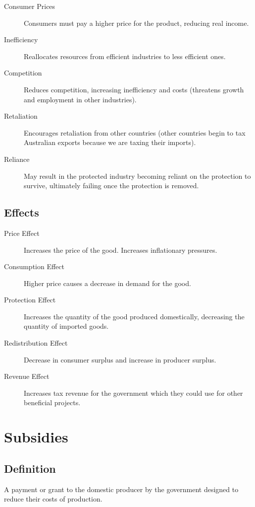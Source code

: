 \documentclass[a4paper,11pt]{report}
\begin{document}
\begin{description}
\item [Consumer Prices] Consumers must pay a higher price for the product,
	reducing real income.
\item [Inefficiency] Reallocates resources from efficient industries to less
	efficient ones.
\item [Competition] Reduces competition, increasing inefficiency and costs
	(threatens growth and employment in other industries).
\item [Retaliation] Encourages retaliation from other countries (other countries
	begin to tax Australian exports because we are taxing their imports).
\item [Reliance] May result in the protected industry becoming reliant on the
	protection to survive, ultimately failing once the protection is removed.
\end{description}

\subsection{Effects}

\begin{description}
\item [Price Effect] Increases the price of the good. Increases
	inflationary pressures.
\item [Consumption Effect] Higher price causes a decrease in demand for
	the good.
\item [Protection Effect] Increases the quantity of the good produced
	domestically, decreasing the quantity of imported goods.
\item [Redistribution Effect] Decrease in consumer surplus and increase
	in producer surplus.
\item [Revenue Effect] Increases tax revenue for the government which
	they could use for other beneficial projects.
\end{description}


\section{Subsidies}

\subsection{Definition}

A payment or grant to the domestic producer by the government designed to reduce
their costs of production.
\end{document}
